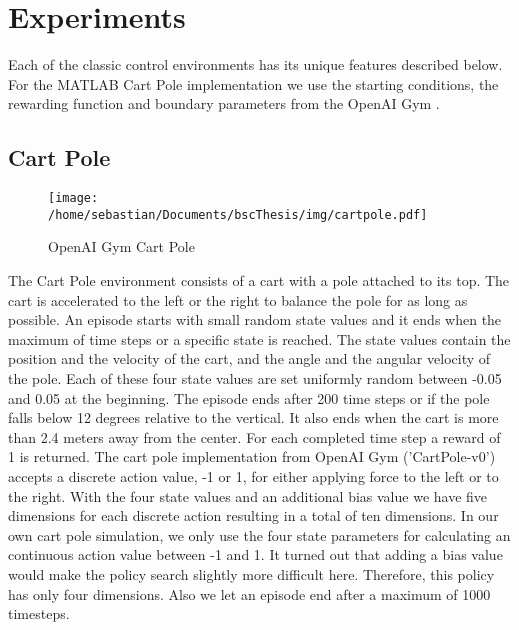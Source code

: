 \chapter{Experiments}
\label{chap:4}


Each of the classic control environments has its unique features described below. For the MATLAB Cart Pole implementation we use the starting conditions, the rewarding function and boundary parameters from the OpenAI Gym \cite{DBLP:journals/corr/BrockmanCPSSTZ16}.

\section{Cart Pole}

\begin{wrapfigure}{R}{0.2\textwidth}
    \centering
    \texttt{[image: /home/sebastian/Documents/bscThesis/img/cartpole.pdf]}
    \caption*{OpenAI Gym Cart Pole\label{fig:cartpolePygym}}
\end{wrapfigure}


The Cart Pole environment consists of a cart with a pole attached to its top. The cart is accelerated to the left or the right to balance the pole for as long as possible. An episode starts with small random state values and it ends when the maximum of time steps or a specific state is reached. The state values contain the position and the velocity of the cart, and the angle and the angular velocity of the pole. Each of these four state values are set uniformly random between -0.05 and 0.05 at the beginning. The episode ends after 200 time steps or if the pole falls below 12 degrees relative to the vertical. It also ends when the cart is more than 2.4 meters away from the center. For each completed time step a reward of 1 is returned. The cart pole implementation from OpenAI Gym ('CartPole-v0') accepts a discrete action value, -1 or 1, for either applying force to the left or to the right. With the four state values and an additional bias value we have five dimensions for each discrete action resulting in a total of ten dimensions. In our own cart pole simulation, we only use the four state parameters for calculating an continuous action value between -1 and 1. It turned out that adding a bias value would make the policy search slightly more difficult here. Therefore, this policy has only four dimensions. Also we let an episode end after a maximum of 1000 timesteps.


